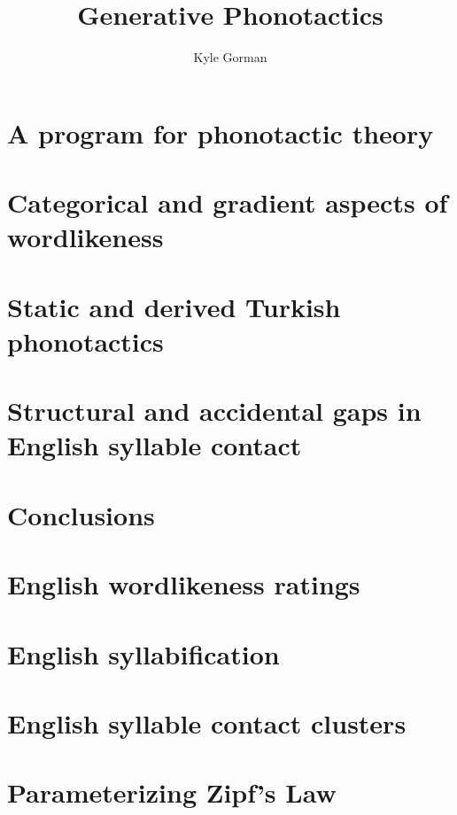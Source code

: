 \documentclass[12pt]{upenndiss}
\title{Generative Phonotactics}
\author{Kyle Gorman}
\begin{document}
\FrontMatter

\chapter{A program for phonotactic theory} 
\chapter{Categorical and gradient aspects of wordlikeness} 
\chapter{Static and derived Turkish phonotactics} 
\chapter{Structural and accidental gaps in English syllable contact} 
\chapter{Conclusions} 

\appendix 
\renewcommand{\arraystretch}{0.25}

\chapter{English wordlikeness ratings} 
\chapter{English syllabification} 
\chapter{English syllable contact clusters} 
\chapter{Parameterizing Zipf's Law} 



\end{document}
